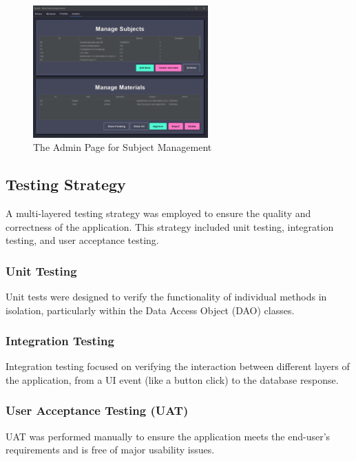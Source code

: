 \documentclass[12pt, a4paper]{report}
\begin{document}
\begin{itemize}
\begin{figure}[h!]
    \centering
    \includegraphics[width=0.6\textwidth]{new_images_note/admin_page.png} %
    \caption{The Admin Page for Subject Management}
    \label{fig:admin_page}
\end{figure}

\subsection{Testing Strategy}
A multi-layered testing strategy was employed to ensure the quality and correctness of the application. This strategy included unit testing, integration testing, and user acceptance testing.

\subsubsection{Unit Testing}
Unit tests were designed to verify the functionality of individual methods in isolation, particularly within the Data Access Object (DAO) classes.

\subsubsection{Integration Testing}
Integration testing focused on verifying the interaction between different layers of the application, from a UI event (like a button click) to the database response.

\subsubsection{User Acceptance Testing (UAT)}
UAT was performed manually to ensure the application meets the end-user's requirements and is free of major usability issues.


\end{itemize}
\end{document}
